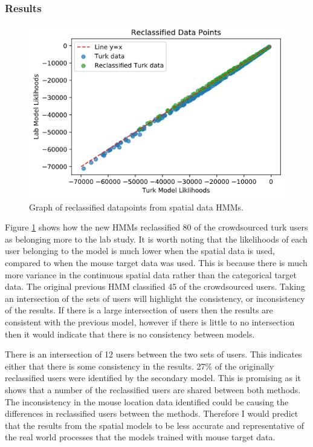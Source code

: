 \documentclass{article}
\begin{document}
\subsubsection{Results}

\begin{figure}[ht!]
    \centering
    \includegraphics[scale=0.5]{Images/Spatial-Reclassified-Data.png}
    \caption{Graph of reclassified datapoints from spatial data HMMs.}
    \label{fig:SpatialRecData}
\end{figure}


Figure \ref{fig:SpatialRecData} shows how the new HMMs reclassified 80 of the crowdsourced turk users as belonging more to the lab study.
It is worth noting that the likelihoods of each user belonging to the model is much lower when the spatial data is used, 
compared to when the mouse target data was used.
This is because there is much more variance in the continuous spatial data rather than the categorical target data.
The original previous HMM classified 45 of the crowdsourced users.
Taking an intersection of the sets of users will highlight the consistency, or inconsistency of the results.
If there is a large intersection of users then the results are consistent with the previous model, however if there is little to no intersection then it would indicate that there is no consistency between models. 


There is an intersection of 12 users between the two sets of users.
This indicates either that there is some consistency in the results.
27\% of the originally reclassified users were identified by the secondary model. 
This is promising as it shows that a number of the reclassified users are shared between both methods.
The inconsistency in the mouse location data identified could be causing the differences in reclassified users between the methods.
Therefore I would predict that the results from the spatial models to be less accurate and representative of the real world processes that the models trained with mouse target data. 
\end{document}
